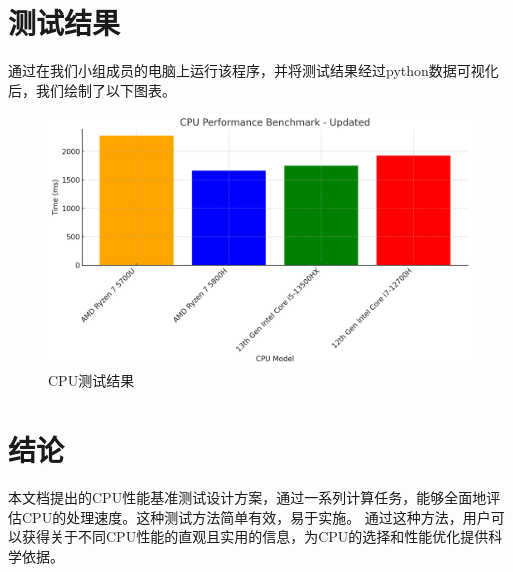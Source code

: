 \documentclass{ctexart}
\begin{document}
\section{测试结果}
通过在我们小组成员的电脑上运行该程序，并将测试结果经过python数据可视化后，我们绘制了以下图表。
\begin{figure}[H]
    \centering
    \includegraphics[width=1\textwidth]{3bae2083-77d4-4bf9-a107-23f6ebdfb357.png}
    \caption{CPU测试结果}
    \label{fig:image1}
    \end{figure}
\section{结论}
本文档提出的CPU性能基准测试设计方案，通过一系列计算任务，能够全面地评估CPU的处理速度。这种测试方法简单有效，易于实施。
通过这种方法，用户可以获得关于不同CPU性能的直观且实用的信息，为CPU的选择和性能优化提供科学依据。
\end{document}
